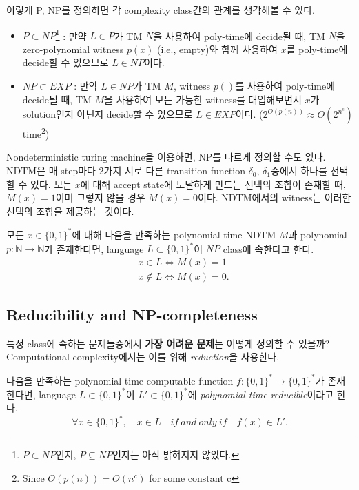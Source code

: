 \vspace{1em}

이렇게 P, NP를 정의하면 각 complexity class간의 관계를 생각해볼 수 있다.
\begin{itemize}
    \item $P \subset NP$\footnote{$P\subset NP$인지, $P\subseteq NP$인지는 아직 밝혀지지 않았다.} : 만약 $L \in P$가 TM $N$을 사용하여 poly-time에 decide될 때, TM $N$을 zero-polynomial witness $p(x)$ (i.e., empty)와 함께 사용하여 $x$를 poly-time에 decide할 수 있으므로 $L \in NP$이다.
    \item $NP \subset EXP$ : 만약 $L \in NP$가 TM $M$, witness $p()$를 사용하여 poly-time에 decide될 때, TM $M$을 사용하여 모든 가능한 witness를 대입해보면서 $x$가 solution인지 아닌지 decide할 수 있으므로 $L \in EXP$이다. ($2^{O(p(n))} \approx O(2^{n^c})$ time\footnote{ Since $O(p(n)) = O(n^c)$ for some constant c})
\end{itemize}

Nondeterministic turing machine을 이용하면, NP를 다르게 정의할 수도 있다. NDTM은 매 step마다 2가지 서로 다른 transition function $\delta_0$, $\delta_1$중에서 하나를 선택할 수 있다. 모든 $x$에 대해 accept state에 도달하게 만드는 선택의 조합이 존재할 때, $M(x) = 1$이며 그렇지 않을 경우 $M(x) = 0$이다. NDTM에서의 witness는 이러한 선택의 조합을 제공하는 것이다.
\begin{definition}\label{def:NP-alt}
    모든 $x \in \{0, 1\}^*$에 대해 다음을 만족하는 polynomial time NDTM $M$과 polynomial $p: \mathbb N \rightarrow \mathbb N$가 존재한다면, language $L \subset \{0, 1\}^*$이 $NP$ class에 속한다고 한다.
    $$ \begin{aligned}
        & x \in L \Longleftrightarrow M(x)=1 \\
        & x \notin L \Longleftrightarrow M(x)=0 .
    \end{aligned} $$
\end{definition}

\subsection{Reducibility and NP-completeness}
특정 class에 속하는 문제들중에서 \textbf{가장 어려운 문제}는 어떻게 정의할 수 있을까? Computational complexity에서는 이를 위해 \textit{reduction}을 사용한다.
\begin{definition}\label{def:reduction}
    다음을 만족하는 polynomial time computable function $f: \{0, 1\}^* \rightarrow \{0, 1\}^*$가 존재한다면, language $L \subset \{0, 1\}^*$이 $L' \subset \{0, 1\}^*$에 \textit{polynomial time reducible}이라고 한다.
    \begin{equation*}
        \forall x \in \{0, 1\}^*, \quad x \in L \quad if \ and \ only\ if \quad  f(x) \in L' .
    \end{equation*}
\end{definition}

